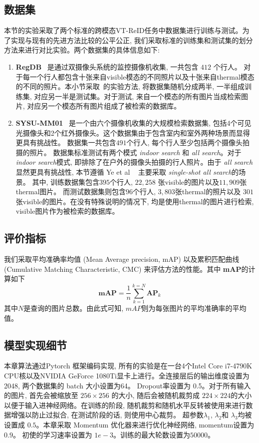 \subsection{数据集}
本节的实验采取了两个标准的跨模态VT-ReID任务中数据集进行训练与测试。为了实现与现有的先进方法比较的公平公正, 我们采取标准的训练集和测试集的划分方法来进行对比实验。两个数据集的具体信息如下:
\begin{enumerate}
  \item \textbf{RegDB}~\cite{nguyen2017person} 是通过双摄像头系统的监控摄像机收集, 一共包含 $412$ 个行人。 对于每一个行人都包含十张来自visible模态的不同照片以及十张来自thermal模态的不同的照片。本小节采取~\cite{ye2018hierarchical}的实验方法, 将数据集随机分成两半, 一半组成训练集, 对应另一半是测试集。对于测试, 来自一个模态的所有图片当成检索图片, 对应另一个模态所有图片组成了被检索的数据库。 
  \item \textbf{SYSU-MM01}~\cite{wu2017rgb} 是一个由六个摄像机收集的大规模检索数据集, 包括4个可见光摄像头和2个红外摄像头。这个数据集由于包含室内和室外两种场景而显得更具有挑战性。 数据集一共包含$491$个行人, 每个行人至少包括两个摄像头拍摄的照片。 数据集标准测试有两个模式 \textit{indoor search} 和 \textit{all search}。对于 \textit{indoor search}模式, 即排除了在户外的摄像头拍摄的行人照片。由于 \textit{all search}显然更具有挑战性, 本节遵循 Ye et al ~\cite{ye2018visible} 主要采取 \textit{single-shot all search}的场景。 其中, 训练数据集包含$395$个行人, $22,258$ 张visible的图片以及$11,909$张thermal图片。 而测试数据集则包含$96$个行人, $3,803$张thermal的照片以及 $301$张visible的图片。在没有特殊说明的情况下, 均是使用thermal的图片进行检索, visible图片作为被检索的数据库。
\end{enumerate}
\subsection{评价指标}
我们采取平均准确率均值 (Mean Average precision, mAP) 以及累积匹配曲线 (Cumulative Matching Characteristic, CMC) 来评估方法的性能。其中 \textbf{mAP}的计算如下
\begin{equation}
   \textbf{mAP} = \frac{1}{n} \sum_{k=1}^{k= N} \textbf{AP}_k
\end{equation}
其中$N$是查询的图片总数。由此式可知, $mAP$则为每张图片的平均准确率的平均值。
\subsection{模型实现细节}
本章算法通过Pytorch 框架编码实现, 所有的实验是在一台4个Intel Core i7-4790K CPU核以及NVIDIA GeForce 1080Ti显卡上进行。全连接层后的输出维度设置为 2048, 两个数据集的 batch 大小设置为64。 Dropout率设置为 0.5。对于所有输入的图片, 首先会被缩放至 $256 \times 256$ 的大小, 随后会被随机裁剪成 $224 \times 224$的大小以便于输入进神经网络。在训练的阶段, 随机裁剪和随机水平反转被使用来进行数据增强以防止过拟合, 在测试阶段的话, 则使用中心裁剪。 超参数$\lambda_1$, $\lambda_2$和 $\lambda_3$均被设置成 $0.5$。本章采取 Momentum 优化器来进行优化神经网络, momentum设置为 $0.9$。 初使的学习速率设置为 $1e-3$。训练的最大轮数设置为$50000$。



